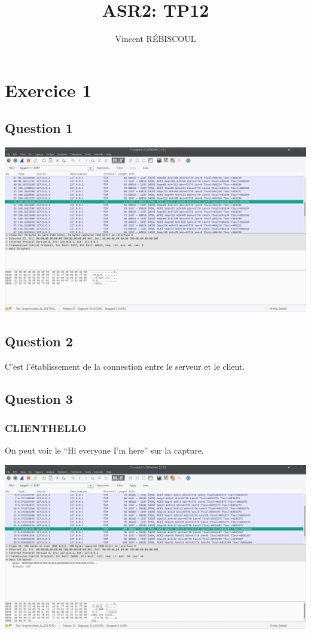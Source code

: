 \documentclass[10,a4paper]{article}
\title{ASR2: TP12}
\author{Vincent RÉBISCOUL}
\begin{document}
\maketitle
\section*{Exercice 1}
\subsection*{Question 1}
\begin{center}
  \includegraphics[width=15cm]{exo1_1.png}
\end{center}
\subsection*{Question 2}
C'est l'établissement de la connection entre le serveur et le client.

\subsection*{Question 3}
\subsubsection*{CLIENTHELLO}
On peut voir le ``Hi everyone I'm here'' sur la capture.
\begin{center}
  \includegraphics[width=15cm]{exo1_3_clienthello.png}
\end{center}
\end{document}
